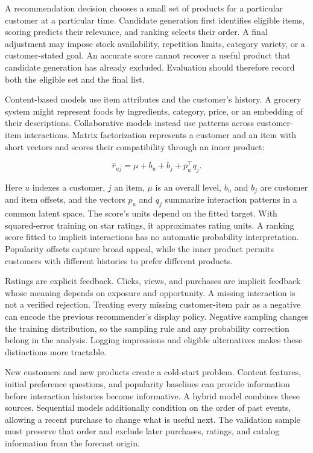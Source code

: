 \noindent A recommendation decision chooses a small set of products for a
particular customer at a particular time. Candidate generation first
identifies eligible items, scoring predicts their relevance, and ranking
selects their order. A final adjustment may impose stock availability,
repetition limits, category variety, or a customer-stated goal. An
accurate score cannot recover a useful product that candidate generation
has already excluded. Evaluation should therefore record both the
eligible set and the final list.

Content-based models use item attributes and the customer's history. A
grocery system might represent foods by ingredients, category, price, or
an embedding of their descriptions. Collaborative models instead use
patterns across customer-item interactions. Matrix factorization
represents a customer and an item with short vectors and scores their
compatibility through an inner product:

\[
\hat r_{uj}=\mu+b_u+b_j+p_u^\top q_j.
\]

Here \(u\) indexes a customer, \(j\) an item, \(\mu\) is an overall
level, \(b_u\) and \(b_j\) are customer and item offsets, and the
vectors \(p_u\) and \(q_j\) summarize interaction patterns in a common
latent space. The score's units depend on the fitted target. With
squared-error training on star ratings, it approximates rating units. A
ranking score fitted to implicit interactions has no automatic
probability interpretation. Popularity offsets capture broad appeal,
while the inner product permits customers with different histories to
prefer different products.

Ratings are explicit feedback. Clicks, views, and purchases are implicit
feedback whose meaning depends on exposure and opportunity. A missing
interaction is not a verified rejection. Treating every missing
customer-item pair as a negative can encode the previous recommender's
display policy. Negative sampling changes the training distribution, so
the sampling rule and any probability correction belong in the analysis.
Logging impressions and eligible alternatives makes these distinctions
more tractable.

New customers and new products create a cold-start problem. Content
features, initial preference questions, and popularity baselines can
provide information before interaction histories become informative. A
hybrid model combines these sources. Sequential models additionally
condition on the order of past events, allowing a recent purchase to
change what is useful next. The validation sample must preserve that
order and exclude later purchases, ratings, and catalog information from
the forecast origin.

